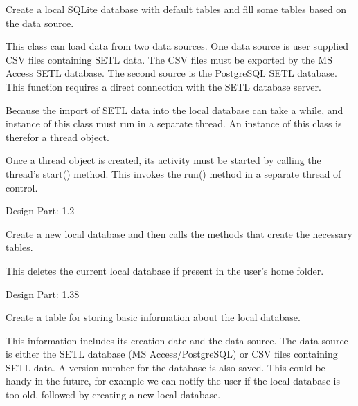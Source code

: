 \documentclass[letterpaper,10pt,english]{sphinxmanual}
\begin{document}
\begin{fulllineitems}
\label{setlyze/database:setlyze.database.MakeLocalDB}
Create a local SQLite database with default tables and fill some
tables based on the data source.

This class can load data from two data sources. One data source
is user supplied CSV files containing SETL data. The CSV files must
be exported by the MS Access SETL database.
The second source is the PostgreSQL SETL database. This function
requires a direct connection with the SETL database server.

Because the import of SETL data into the local database can take
a while, and instance of this class must run in a separate thread.
An instance of this class is therefor a thread object.

Once a thread object is created, its activity must be started by
calling the thread’s start() method. This invokes the run() method
in a separate thread of control.

Design Part: 1.2

\begin{fulllineitems}
\label{setlyze/database:setlyze.database.MakeLocalDB.create_new_db}
Create a new local database and then calls the methods
that create the necessary tables.

This deletes the current local database if present in the user's
home folder.

Design Part: 1.38

\end{fulllineitems}


\begin{fulllineitems}
\label{setlyze/database:setlyze.database.MakeLocalDB.create_table_info}
Create a table for storing basic information about the
local database.

This information includes its creation date and the data source.
The data source is either the SETL database (MS Access/PostgreSQL)
or CSV files containing SETL data. A version number for the
database is also saved. This could be handy in the future,
for example we can notify the user if the local database is
too old, followed by creating a new local database.


\end{fulllineitems}
\end{fulllineitems}
\end{document}
